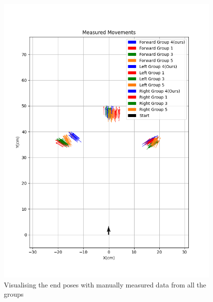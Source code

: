 {        \begin{figure}[!ht] 
            \centering \includegraphics[scale=.60]{"images/experiment_2/3.merged-end-poses.png"}
            \caption{Visualising the end poses with manually measured data from all the groups}
            \label{fig:merged-end-poses}
        \end{figure}
    
}
